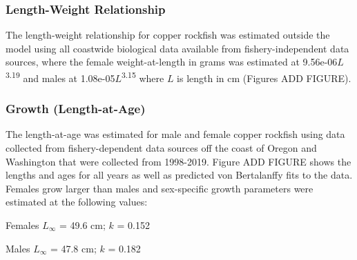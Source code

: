 \documentclass[11pt,
  english,
  a4paper,
]{article}
\begin{document}
\hypertarget{length-weight-relationship}{%
\subsubsection{Length-Weight Relationship}\label{length-weight-relationship}}

\leavevmode\tagmcend\tagstructend


The length-weight relationship for copper rockfish was estimated outside the model using all coastwide biological data available from fishery-independent data sources, where the female weight-at-length in grams was estimated at 9.56e-06{\(L\)\leavevmode\tagmcend\tagstructend}\textsuperscript{3.19} and males at 1.08e-05{\(L\)\leavevmode\tagmcend\tagstructend}\textsuperscript{3.15} where {\(L\)\leavevmode\tagmcend\tagstructend} is length in cm (Figures ADD FIGURE).

\leavevmode\tagmcend\tagstructend\par


\hypertarget{growth-length-at-age}{%
\subsubsection{Growth (Length-at-Age)}\label{growth-length-at-age}}

\leavevmode\tagmcend\tagstructend


The length-at-age was estimated for male and female copper rockfish using data collected from fishery-dependent data sources off the coast of Oregon and Washington that were collected from 1998-2019. Figure ADD FIGURE shows the lengths and ages for all years as well as predicted von Bertalanffy fits to the data. Females grow larger than males and sex-specific growth parameters were estimated at the following values:

\leavevmode\tagmcend\tagstructend\par

\begin{centering}

Females $L_{\infty}$ = 49.6 cm; $k$ = 0.152

Males $L_{\infty}$ = 47.8 cm; $k$ = 0.182

\end{centering}
\end{document}
